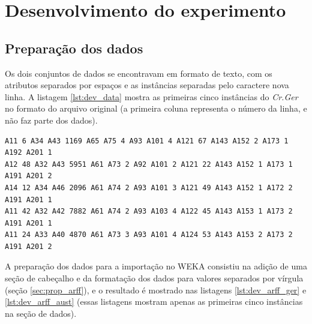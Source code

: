 \chapter{Desenvolvimento do experimento}

\section{Preparação dos dados}

Os dois conjuntos de dados se encontravam em formato de texto, com os atributos separados por espaços e as instâncias separadas pelo caractere nova linha. A listagem \ref{lst:dev_data} mostra as primeiras cinco instâncias do \emph{Cr.Ger} no formato do arquivo original (a primeira coluna representa o número da linha, e não faz parte dos dados).

\vspace{0.5cm}
\begin{lstlisting}[caption=Formato original dos dados (\emph{Cr.Ger}), label=lst:dev_data]
A11 6 A34 A43 1169 A65 A75 4 A93 A101 4 A121 67 A143 A152 2 A173 1 A192 A201 1
A12 48 A32 A43 5951 A61 A73 2 A92 A101 2 A121 22 A143 A152 1 A173 1 A191 A201 2
A14 12 A34 A46 2096 A61 A74 2 A93 A101 3 A121 49 A143 A152 1 A172 2 A191 A201 1
A11 42 A32 A42 7882 A61 A74 2 A93 A103 4 A122 45 A143 A153 1 A173 2 A191 A201 1
A11 24 A33 A40 4870 A61 A73 3 A93 A101 4 A124 53 A143 A153 2 A173 2 A191 A201 2
\end{lstlisting}
\vspace{0.5cm}

A preparação dos dados para a importação no WEKA consistiu na adição de uma seção de cabeçalho e da formatação dos dados para valores separados por vírgula (seção \ref{sec:prop_arff}), e o resultado é mostrado nas listagens \ref{lst:dev_arff_ger} e \ref{lst:dev_arff_aust} (essas listagens mostram apenas as primeiras cinco instâncias na seção de dados).


